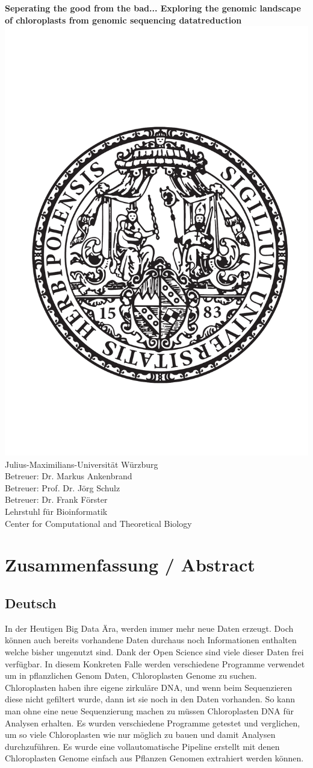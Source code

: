 \documentclass{scrartcl}
\begin{document}
\begin{center}
\textbf{Seperating the good from the bad... Exploring the genomic landscape of chloroplasts from genomic sequencing datatreduction}
\includegraphics[width=.5\linewidth]{./neuSIEGEL.pdf}\\[1cm]
{\large Julius-Maximilians-Universität Würzburg}\\
{\large Betreuer: Dr. Markus Ankenbrand}\\
{\large Betreuer: Prof. Dr. Jörg Schulz}\\
{\large Betreuer: Dr. Frank Förster}\\
{\large Lehrstuhl für Bioinformatik}\\
{\large Center for Computational and Theoretical Biology}
\setcounter{page}{1}
\clearpage
\end{center}
\tableofcontents
\clearpage
\section{Zusammenfassung / Abstract}
\label{sec-1}
\subsection{Deutsch}
\label{sec-1-1}
In der Heutigen Big Data Ära, werden immer mehr neue Daten erzeugt. Doch können auch bereits vorhandene Daten durchaus noch Informationen enthalten welche bisher ungenutzt sind.
Dank der Open Science sind viele dieser Daten frei verfügbar. In diesem Konkreten Falle werden verschiedene Programme verwendet um in pflanzlichen Genom Daten, Chloroplasten Genome zu 
suchen. Chloroplasten haben ihre eigene zirkuläre DNA, und wenn beim Sequenzieren diese nicht gefiltert wurde, dann ist sie noch in den Daten vorhanden. So kann man ohne 
eine neue Sequenzierung machen zu müssen Chloroplasten DNA für Analysen erhalten. Es wurden verschiedene Programme getestet und verglichen, um so viele Chloroplasten 
wie nur möglich zu bauen und damit Analysen durchzuführen. Es wurde eine vollautomatische Pipeline erstellt mit denen Chloroplasten Genome einfach aus Pflanzen Genomen
extrahiert werden können. 
\end{document}
